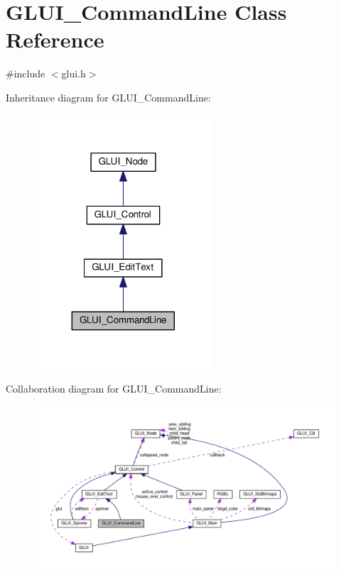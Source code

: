 \hypertarget{class_g_l_u_i___command_line}{\section{G\+L\+U\+I\+\_\+\+Command\+Line Class Reference}
\label{class_g_l_u_i___command_line}
}


{\ttfamily \#include $<$glui.\+h$>$}



Inheritance diagram for G\+L\+U\+I\+\_\+\+Command\+Line\+:\nopagebreak
\begin{figure}[H]
\begin{center}
\leavevmode
\includegraphics[width=188pt]{class_g_l_u_i___command_line__inherit__graph}
\end{center}
\end{figure}


Collaboration diagram for G\+L\+U\+I\+\_\+\+Command\+Line\+:\nopagebreak
\begin{figure}[H]
\begin{center}
\leavevmode
\includegraphics[width=350pt]{class_g_l_u_i___command_line__coll__graph}
\end{center}
\end{figure}
